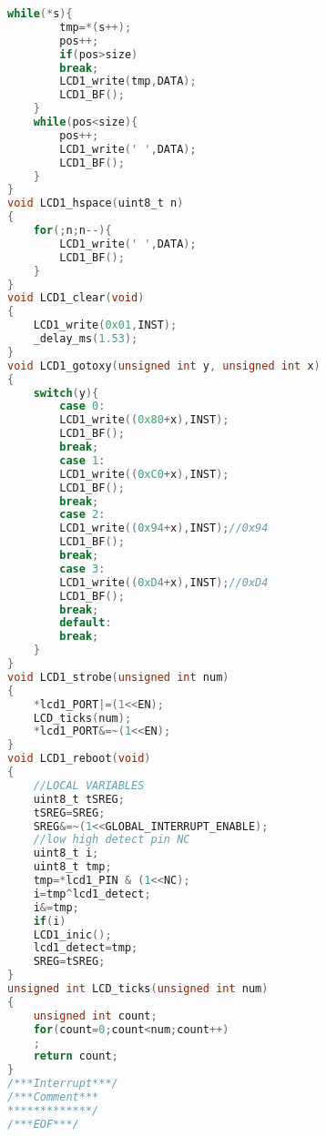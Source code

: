 \begin{lstlisting}[language=C, caption={lcd.c}, label=lcd-c, captionpos=b]
	while(*s){
		tmp=*(s++);
		pos++;
		if(pos>size)
		break;
		LCD1_write(tmp,DATA);
		LCD1_BF();
	}
	while(pos<size){
		pos++;
		LCD1_write(' ',DATA);
		LCD1_BF();
	}
}
void LCD1_hspace(uint8_t n)
{
	for(;n;n--){
		LCD1_write(' ',DATA);
		LCD1_BF();
	}
}
void LCD1_clear(void)
{
	LCD1_write(0x01,INST);
	_delay_ms(1.53);
}
void LCD1_gotoxy(unsigned int y, unsigned int x)
{
	switch(y){
		case 0:
		LCD1_write((0x80+x),INST);
		LCD1_BF();
		break;
		case 1:
		LCD1_write((0xC0+x),INST);
		LCD1_BF();
		break;
		case 2:
		LCD1_write((0x94+x),INST);//0x94
		LCD1_BF();
		break;
		case 3:
		LCD1_write((0xD4+x),INST);//0xD4
		LCD1_BF();
		break;
		default:
		break;
	}
}
void LCD1_strobe(unsigned int num)
{
	*lcd1_PORT|=(1<<EN);
	LCD_ticks(num);
	*lcd1_PORT&=~(1<<EN);
}
void LCD1_reboot(void)
{
	//LOCAL VARIABLES
	uint8_t tSREG;
	tSREG=SREG;
	SREG&=~(1<<GLOBAL_INTERRUPT_ENABLE);
	//low high detect pin NC
	uint8_t i;
	uint8_t tmp;
	tmp=*lcd1_PIN & (1<<NC);
	i=tmp^lcd1_detect;
	i&=tmp;
	if(i)
	LCD1_inic();
	lcd1_detect=tmp;
	SREG=tSREG;
}
unsigned int LCD_ticks(unsigned int num)
{
	unsigned int count;
	for(count=0;count<num;count++)
	;
	return count;
}
/***Interrupt***/
/***Comment***
*************/
/***EOF***/
\end{lstlisting}
